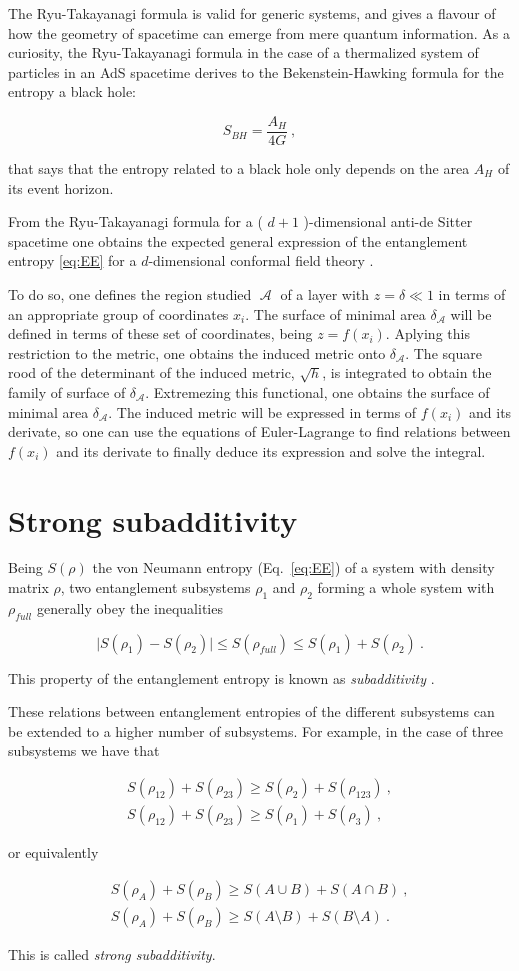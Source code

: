 \documentclass[twocolumn]{revtex4}
\providecommand{\abs}[1]{\lvert#1\rvert}
\providecommand{\eq}[2]{
    \begin{equation}
        #2
    \label{eq:#1}
    \end{equation}
}
\providecommand{\eqgat}[2]{
    \begin{gather}
        #2
    \label{eq:#1}
    \end{gather}
}
\DeclareMathOperator{\calA}{\mathcal{A}}
\begin{document}
The Ryu-Takayanagi formula is valid for generic systems, and gives a flavour of how the geometry of spacetime can emerge from mere quantum information. As a curiosity, the Ryu-Takayanagi formula in the case of a thermalized system of particles in an AdS spacetime derives to the Bekenstein-Hawking formula \cite{bekenstein_black_1973} for the entropy a black hole:
\eq{BH}{
    S_{BH} = \frac{ A_H }{ 4 G } \ ,
}
that says that the entropy related to a black hole only depends on the area $A_H$ of its event horizon.

From the Ryu-Takayanagi formula for a ( $d+1$ )-dimensional anti-de Sitter spacetime one obtains the expected general expression of the entanglement entropy \ref{eq:EE} for a $d$-dimensional conformal field theory \cite{}.

To do so, one defines the region studied $\calA$ of a layer with $z = \delta \ll 1$ in terms of an appropriate group of coordinates $x_i$. The surface of minimal area $\delta_{\calA}$ will be defined in terms of these set of coordinates, being $z = f (x_i)$. Aplying this restriction to the metric, one obtains the induced metric onto $\delta_{\calA}$. The square rood of the determinant of the induced metric, $\sqrt{h}$, is integrated to obtain the family of surface of $\delta_{\calA}$. Extremezing this functional, one obtains the surface of minimal area $\delta_{\calA}$. The induced metric will be expressed in terms of $f(x_i)$ and its derivate, so one can use the equations of Euler-Lagrange to find relations between $f (x_i)$ and its derivate to finally deduce its expression and solve the integral.


\section{Strong subadditivity} \label{s:SS}

Being $S(\rho)$ the von Neumann entropy (Eq.~\ref{eq:EE}) of a system with density matrix $\rho$, two entanglement subsystems $\rho_1$ and $\rho_2$ forming a whole system with $\rho_{full}$ generally obey the inequalities
\eq{EE_subadd}{
    \abs{S(\rho_1)-S(\rho_2)} \le S(\rho_{full}) \le S(\rho_1) + S(\rho_2) \ .
}
This property of the entanglement entropy is known as \textit{subadditivity} \cite{headrick_holographic_2007}.

These relations between entanglement entropies of the different subsystems can be extended to a higher number of subsystems. For example, in the case of three subsystems we have that
\eqgat{EE_strong-subadd}{
    S(\rho_{12}) + S(\rho_{23}) \ge S(\rho_2) + S(\rho_{123}) \ , \nonumber \\
    S(\rho_{12}) + S(\rho_{23}) \ge S(\rho_1) + S(\rho_3) \ ,
}
or equivalently
\eqgat{EE_strong-subadd-2}{
    S(\rho_{A}) + S(\rho_{B}) \ge S(A \cup B) + S(A \cap B) \ , \nonumber \\
    S(\rho_{A}) + S(\rho_{B}) \ge S(A \setminus B) + S(B \setminus A) \ .
}
This is called \textit{strong subadditivity}.
\end{document}
